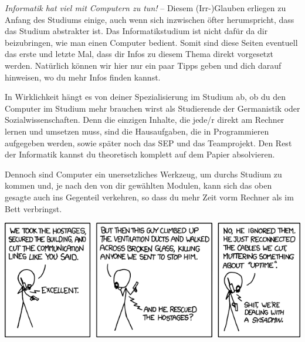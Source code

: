 
\begin{multicols}{2}
\emph{Informatik hat viel mit Computern zu tun!} -- Diesem (Irr-)Glauben erliegen zu Anfang des Studiums einige, auch wenn sich inzwischen öfter herumspricht, dass das Studium abstrakter ist. 
Das Informatikstudium ist nicht dafür da dir beizubringen, wie man einen Computer bedient. 
Somit sind diese Seiten eventuell das erste und letzte Mal, dass dir Infos zu diesem Thema direkt vorgesetzt werden. 
Natürlich können wir hier nur ein paar Tipps geben und dich darauf hinweisen, wo du mehr Infos finden kannst.

In Wirklichkeit hängt es von deiner Spezialisierung im Studium ab, ob du den Computer im Studium mehr brauchen wirst als Studierende der Germanistik oder Sozialwissenschaften. 
Denn die einzigen Inhalte, die jede/r direkt am Rechner lernen und umsetzen muss, sind die Hausaufgaben, die in Programmieren aufgegeben werden, sowie später noch das SEP und das Teamprojekt. 
Den Rest der Informatik kannst du theoretisch komplett auf dem Papier absolvieren.

Dennoch sind Computer ein unersetzliches Werkzeug, um durchs Studium zu kommen und, je nach den von dir gewählten Modulen, kann sich das oben gesagte auch ins Gegenteil verkehren, so dass du mehr Zeit vorm Rechner als im Bett verbringst.






\end{multicols}

\vfill
\begin{center}
		\includegraphics[totalheight=6cm]{bilder/XKCD/devotion_to_duty}
\end{center}
\vfill

